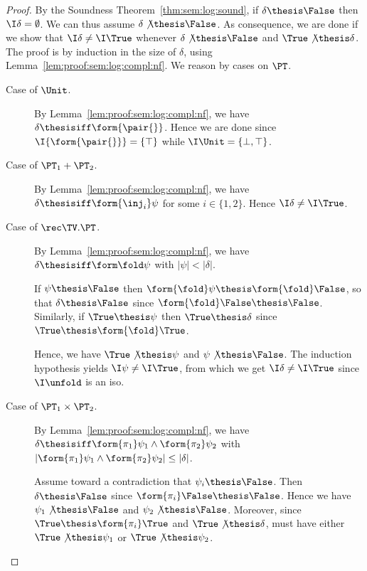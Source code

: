 \begin{proof}
By the Soundness Theorem~\ref{thm:sem:log:sound},
if $\delta \thesis \False$ then $\I\delta = \emptyset$.
We can thus assume $\delta \not\thesis \False$.
%
As consequence, we are done if we show that $\I\delta \neq \I\True$
whenever $\delta \not\thesis \False$ and $\True \not\thesis \delta$.
%
The proof is by induction in the size of $\delta$,
using Lemma~\ref{lem:proof:sem:log:compl:nf}.
We reason by cases on $\PT$.
\begin{description}
\item[Case of $\Unit$.]
By Lemma~\ref{lem:proof:sem:log:compl:nf},
we have $\delta \thesisiff \form{\pair{}}$.
Hence we are done since $\I{\form{\pair{}}} = \{\top \}$
while $\I\Unit = \{\bot,\top\}$.

\item[Case of $\PT_1 + \PT_2$.]
By Lemma~\ref{lem:proof:sem:log:compl:nf},
we have $\delta \thesisiff \form{\inj_i} \psi$
for some $i \in \{1,2\}$.
Hence $\I\delta \neq \I\True$.

\item[Case of $\rec\TV.\PT$.]
By Lemma~\ref{lem:proof:sem:log:compl:nf},
we have $\delta \thesisiff \form\fold\psi$
with $|\psi| < |\delta|$.

If $\psi \thesis \False$
then $\form{\fold} \psi \thesis \form{\fold}\False$,
so that $\delta \thesis \False$
since $\form{\fold}\False \thesis \False$.
%
Similarly, 
if $\True \thesis \psi$
then $\True \thesis \delta$
since $\True \thesis \form{\fold}\True$.

Hence, we have $\True \not\thesis \psi$
and $\psi \not\thesis \False$.
The induction hypothesis yields $\I\psi \neq \I\True$,
from which we get $\I\delta \neq \I\True$
since $\I\unfold$ is an iso.


\item[Case of $\PT_1 \times \PT_2$.]
By Lemma~\ref{lem:proof:sem:log:compl:nf},
we have
$\delta \thesisiff \form{\pi_1}\psi_1 \land \form{\pi_2}\psi_2$
with
\(
  |\form{\pi_1}\psi_1 \land \form{\pi_2}\psi_2| \leq |\delta|
\).

Assume toward a contradiction that $\psi_i \thesis \False$.
Then $\delta \thesis \False$ since $\form{\pi_i}\False \thesis \False$.
Hence we have
$\psi_1 \not\thesis \False$ and $\psi_2 \not\thesis \False$.
%
Moreover, since $\True \thesis \form{\pi_i}\True$
and $\True \not\thesis \delta$,
must have either $\True \not\thesis \psi_1$
or $\True \not\thesis \psi_2$.


\end{description}
\end{proof}
